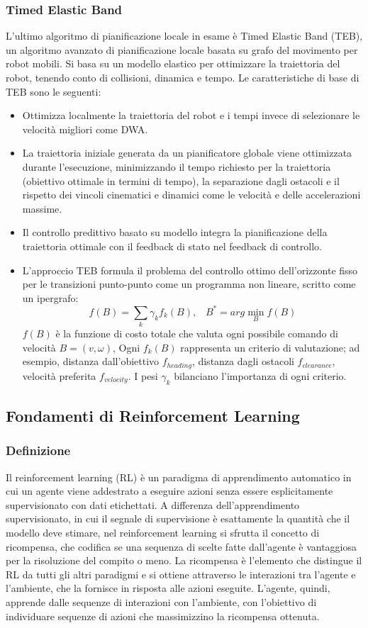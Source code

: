 \subsubsection{Timed Elastic Band} 
L'ultimo algoritmo di pianificazione locale in esame è Timed Elastic Band (TEB), un algoritmo avanzato di pianificazione locale basata su grafo del movimento per robot mobili. Si basa su un modello elastico per ottimizzare la traiettoria del robot, tenendo conto di collisioni, dinamica e tempo. Le caratteristiche di base di TEB sono le seguenti:
\begin{itemize}
    \item Ottimizza localmente la traiettoria del robot e i tempi invece di selezionare le velocità migliori come DWA.
    \item La traiettoria iniziale generata da un pianificatore globale viene ottimizzata durante l'esecuzione, minimizzando il tempo richiesto per la traiettoria (obiettivo ottimale in termini di tempo), la separazione dagli ostacoli e il rispetto dei vincoli cinematici e dinamici come le velocità e delle accelerazioni massime.
    \item Il controllo predittivo basato su modello integra la pianificazione della traiettoria ottimale con il feedback di stato nel feedback di controllo.
    \item L'approccio TEB formula il problema del controllo ottimo dell'orizzonte fisso per le transizioni punto-punto come un programma non lineare, scritto come un ipergrafo:
    \[f(B)=\sum_k\gamma_kf_k(B),\;\;\;B^*=arg \min_Bf(B)\]
    $f(B)$ è la funzione di costo totale che valuta ogni possibile comando di velocità $B=(v,\omega)$, Ogni $f_k(B)$ rappresenta un criterio di valutazione; ad esempio, distanza dall'obiettivo $f_{heading}$, distanza dagli ostacoli $f_{clearance}$, velocità preferita $f_{velocity}$. I pesi $\gamma_k$ bilanciano l'importanza di ogni criterio.
\end{itemize}


\subsection{Fondamenti di Reinforcement Learning}
\subsubsection{Definizione}
Il reinforcement learning (RL) è un paradigma di apprendimento automatico in cui un agente viene addestrato a eseguire azioni senza essere esplicitamente supervisionato con dati etichettati. A differenza dell'apprendimento supervisionato, in cui il segnale di supervisione è esattamente la quantità che il modello deve stimare, nel reinforcement learning si sfrutta il concetto di ricompensa, che codifica se una sequenza di scelte fatte dall'agente è vantaggiosa per la risoluzione del compito o meno. La ricompensa è l'elemento che distingue il RL da tutti gli altri paradigmi e si ottiene attraverso le interazioni tra l'agente e l'ambiente, che la fornisce in risposta alle azioni eseguite. L'agente, quindi, apprende dalle sequenze di interazioni con l'ambiente, con l'obiettivo di individuare sequenze di azioni che massimizzino la ricompensa ottenuta. 

